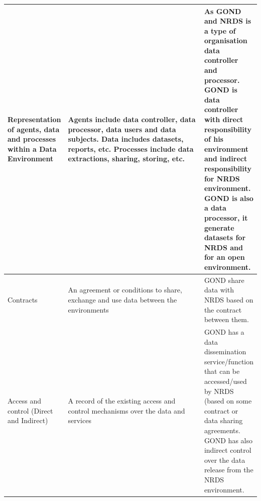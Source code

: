 \begin{table}[!htbp]
\begin{sideways}
\begin{tabular}{>{\raggedright\arraybackslash} p{0.2\linewidth} p{0.6\linewidth} p{0.75\linewidth}  }
Representation of agents, data and processes within a Data Environment & Agents include data controller, data processor, data users and data subjects. Data includes datasets, reports, etc. Processes include data extractions, sharing, storing, etc. &
  As GOND  and NRDS is a type of organisation data controller and processor. GOND is data controller with direct responsibility of his environment and indirect responsibility for NRDS environment. GOND is also a data processor, it generate datasets for NRDS and for an open environment. \\
\midrule
Contracts & 
An agreement or conditions to share, exchange and use data between the environments   &  GOND share data with NRDS based on the  contract between them. \\

\midrule

Access and control (Direct and Indirect)  &
A record of the existing access and control mechanisms over the data and services &  GOND has a data dissemination service/function that can be accessed/used by NRDS (based on some contract or data sharing agreements. GOND has also indirect control over the data release from the NRDS environment.  \\
\bottomrule   
\end{tabular}
\end{sideways}
    \end{table}


